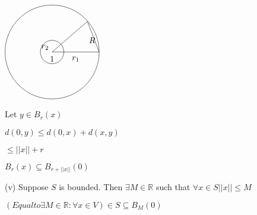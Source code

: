 \documentclass{article}
\theoremstyle{definition}
\numberwithin{equation}{section}
\begin{document}
$
\begin{tikzpicture}
\draw (0,0) circle (2cm);
\draw (0,0) -- (2,0);
\draw (2,0) -- (1.5,1.3);
\draw (1.5,1.3) -- (0,0);
\draw (0,0) circle (0.5cm);
\node at (-0.3, 0.2) {$r_2$};
\node at (1, -0.3) {$r_1$};
\node at (0, -0.3) {$1$};
\node at (1.7, 0.5) {$R$};
\end{tikzpicture}
$

Let $y \in B_r(x)$

$ d(0,y) \leq d(0,x) + d(x,y) $

$ \leq || x || + r $

\Rightarrow 
$ B_r(x) \subseteq B_{r + ||  x  ||}(0) $

(v) Suppose $S$ is bounded. Then $\exists M \in \mathbb{R}$ such that $\forall x \in S || x || \leq M$ 

$ (Equal to \exists M \in \mathbb{R} : \forall x \in V ) \in S \subseteq B_M(0) $
\end{document}
